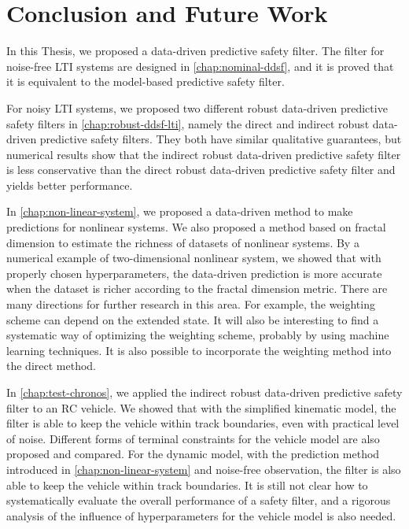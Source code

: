 \chapter{Conclusion and Future Work}\label{chap:conclusion}

In this Thesis, we proposed a data-driven predictive safety filter.
The filter for noise-free LTI systems are designed in \cref{chap:nominal-ddsf}, and it is proved that it is equivalent to the model-based predictive safety filter.

For noisy LTI systems, we proposed two different robust data-driven predictive safety filters in \cref{chap:robust-ddsf-lti}, namely the direct and indirect robust data-driven predictive safety filters.
They both have similar qualitative guarantees, but numerical results show that the indirect robust data-driven predictive safety filter is less conservative than the direct robust data-driven predictive safety filter and yields better performance.

In \cref{chap:non-linear-system}, we proposed a data-driven method to make predictions for nonlinear systems.
We also proposed a method based on fractal dimension to estimate the richness of datasets of nonlinear systems.
By a numerical example of two-dimensional nonlinear system, we showed that with properly chosen hyperparameters, the data-driven prediction is more accurate when the dataset is richer according to the fractal dimension metric.
There are many directions for further research in this area.
For example, the weighting scheme can depend on the extended state.
It will also be interesting to find a systematic way of optimizing the weighting scheme, probably by using machine learning techniques.
It is also possible to incorporate the weighting method into the direct method.

In \cref{chap:test-chronos}, we applied the indirect robust data-driven predictive safety filter to an RC vehicle.
We showed that with the simplified kinematic model, the filter is able to keep the vehicle within track boundaries, even with practical level of noise.
Different forms of terminal constraints for the vehicle model are also proposed and compared.
For the dynamic model, with the prediction method introduced in \cref{chap:non-linear-system} and noise-free observation, the filter is also able to keep the vehicle within track boundaries.
It is still not clear how to systematically evaluate the overall performance of a safety filter, and a rigorous analysis of the influence of hyperparameters for the vehicle model is also needed.
